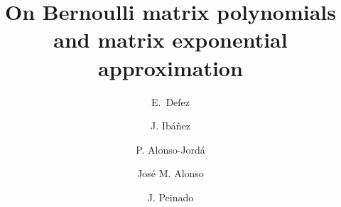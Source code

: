 \documentclass[preprint,10pt,numbers,sort&compress]{elsarticle}
\begin{document}

\begin{frontmatter}



\title{On Bernoulli matrix polynomials and matrix exponential approximation }


\author[imm]{E.~Defez}
\author[i3m]{J. Ib\'a\~nez}
\author[dsic]{P. Alonso-Jord\'{a}}
\author[i3m]{Jos\'e M. Alonso}
\author[dsic]{J. Peinado}

\address[imm]{Instituto de Matem\'{a}tica Multidisciplinar}
\address[i3m]{Instituto de Instrumentaci\'{o}n para Imagen Molecular}
\address{Universitat Polit\`{e}cnica de Val\`{e}ncia, Camino de Vera s/n, 46022, Valencia. Spain}
\address[dsic]{Department of Information Systems and Computation}


\end{frontmatter}
\end{document}
